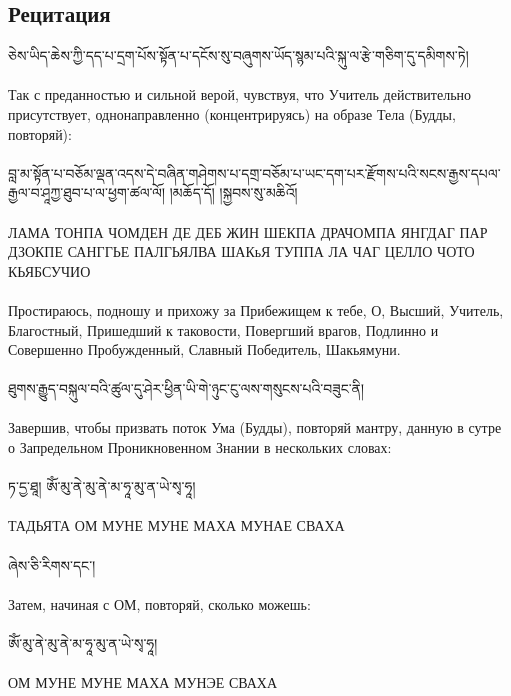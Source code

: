 \subsection{Рецитация}
\scriptsize
\ti
ཅེས་ཡིད་ཆེས་ཀྱི་དད་པ་དྲག་པོས་སྟོན་པ་དངོས་སུ་བཞུགས་ཡོད་སྙམ་པའི་སྐུ་ལ་རྩེ་གཅིག་དུ་དམིགས་ཏེ།\\
\\
\ru
Так с преданностью и сильной верой, чувствуя, что Учитель действительно присутствует,
однонаправленно (концентрируясь) на образе Тела (Будды, повторяй):\\
\\
\normalsize
\ti
བླ་མ་སྟོན་པ་བཅོམ་ལྡན་འདས་དེ་བཞིན་གཤེགས་པ་དགྲ་བཅོམ་པ་ཡང་དག་པར་རྫོགས་པའི་སངས་རྒྱས་དཔལ་རྒྱལ་བ་ཤཱཀྱ་ཐུབ་པ་ལ་ཕྱག་ཚལ་ལོ། 
།མཆོད་དོ། །སྐྱབས་སུ་མཆིའོ། \\
\\
\ru
ЛАМА ТОНПА ЧОМДЕН ДЕ ДЕБ ЖИН ШЕКПА ДРАЧОМПА ЯНГДАГ ПАР ДЗОКПЕ
САНГГЬЕ ПАЛГЬЯЛВА ШАКьЯ ТУППА ЛА ЧАГ ЦЕЛЛО ЧОТО КЬЯБСУЧИО\\
\\
Простираюсь, подношу и прихожу за Прибежищем к тебе, О, Высший, Учитель, Благостный,
Пришедший к таковости, Повергший врагов, Подлинно и Совершенно Пробужденный,
Славный Победитель, Шакьямуни.\\
\\
\scriptsize
\ti
ཐུགས་རྒྱུད་བསྐུལ་བའི་ཚུལ་དུ་ཤེར་ཕྱིན་ཡི་གེ་ཉུང་ངུ་ལས་གསུངས་པའི་བཟུང་ནི།\\
\\
\ru
Завершив, чтобы призвать поток Ума (Будды), повторяй мантру,
данную в сутре о Запредельном Проникновенном Знании в нескольких словах:\\
\\
\normalsize
\ti
ཏ་དྱ་ཐཱ། ཨོཾ་མུ་ནེ་མུ་ནེ་མ་ཧཱ་མུ་ན་ཡེ་སྭ་ཧཱ།\\
\\
\ru
ТАДЬЯТА ОМ МУНЕ МУНЕ МАХА МУНАЕ СВАХА\\
\\
\scriptsize
\ti ཞེས་ཅི་རིགས་དང་།\\
\\
\ru Затем, начиная с ОМ, повторяй, сколько можешь:\\
\\
\normalsize
\ti ཨོཾ་མུ་ནེ་མུ་ནེ་མ་ཧཱ་མུ་ན་ཡེ་སྭ་ཧཱ།\\
\\
\ru  ОМ МУНЕ МУНЕ МАХА МУНЭЕ СВАХА\\
\\
\newpage
